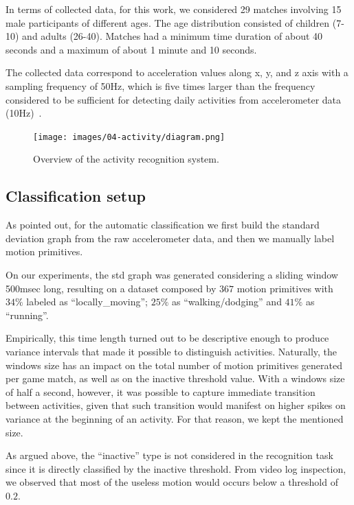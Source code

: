In terms of collected data, for this work, we considered 29 matches involving 15 male participants of different ages. The age distribution consisted of children (7-10) and adults (26-40). Matches had a minimum time duration of about 40 seconds and a maximum of about 1 minute and 10 seconds. 

The collected data correspond to acceleration values along x, y, and z axis with a sampling frequency of 50Hz, which is five times larger than the frequency considered to be sufficient for detecting daily activities from accelerometer data (10Hz)~\cite{atallah_sensor_2010, ravi_activity_2005, kikhia_analyzing_2014}.

\begin{figure}[!t]
\normalsize
      \centering
      {\texttt{[image: images/04-activity/diagram.png]}}
      \caption{Overview of the activity recognition system.}
      \label{approach}
\end{figure}

\subsection{Classification setup}

As pointed out, for the automatic classification we first build the standard deviation graph from the raw accelerometer data, and then we manually label motion primitives. 

On our experiments, the std graph was generated considering a sliding window 500msec long, resulting on a dataset composed by $367$ motion primitives with $34\%$ labeled as ``locally\_moving''; $25\%$ as ``walking/dodging'' and $41\%$ as ``running''.%

Empirically, this time length turned out to be descriptive enough to produce variance intervals that made it possible to distinguish activities. Naturally, the windows size has an impact on the total number of motion primitives generated per game match, as well as on the inactive threshold value. With a windows size of half a second, however, it was possible to capture immediate transition between activities, given that such transition would manifest on higher spikes on variance at the beginning of an activity. For that reason, we kept the mentioned size. 

As argued above, the ``inactive'' type is not considered in the recognition task since it is directly classified by the inactive threshold. From video log inspection, we observed that most of the useless motion would occurs below a threshold of $0.2$. 

